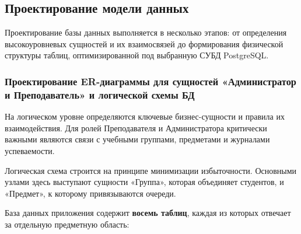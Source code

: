\subsection{Проектирование модели данных}

Проектирование базы данных выполняется в несколько этапов: от определения высокоуровневых сущностей 
и их взаимосвязей до формирования физической структуры таблиц, оптимизированной под выбранную СУБД PostgreSQL.

\subsubsection{Проектирование ER-диаграммы для сущностей «Администратор и Преподаватель» и логической схемы БД}

На логическом уровне определяются ключевые бизнес-сущности и правила их взаимодействия. Для ролей Преподавателя
и Администратора критически важными являются связи с учебными группами, предметами и журналами успеваемости.

Логическая схема строится на принципе минимизации избыточности. Основными узлами здесь выступают сущности «Группа»,
 которая объединяет студентов, и «Предмет», к которому привязываются очереди.

База данных приложения содержит \textbf{восемь таблиц}, каждая из которых отвечает за отдельную предметную область:

